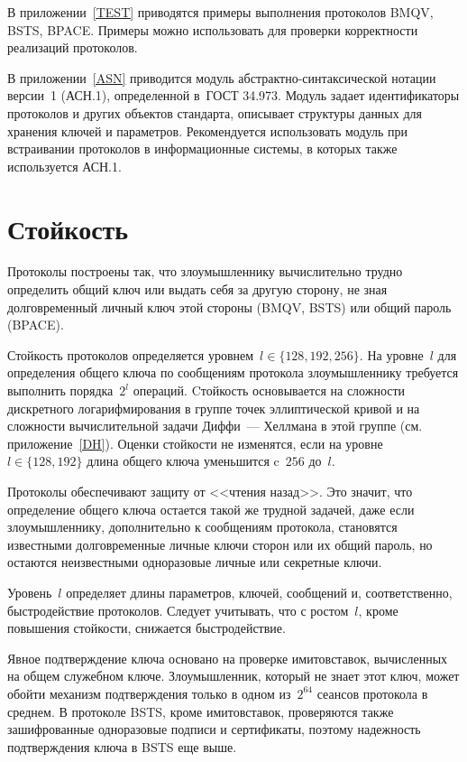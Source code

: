 В приложении~\ref{TEST} приводятся примеры выполнения 
протоколов BMQV, BSTS, BPACE.
Примеры можно использовать для проверки корректности реализаций 
протоколов.

В приложении~\ref{ASN} приводится модуль
абстрактно-синтаксической нотации версии~1 (АСН.1),
определенной в~ГОСТ 34.973.
Модуль задает идентификаторы протоколов и других объектов 
стандарта, описывает структуры данных для хранения 
ключей и параметров.
%
Рекомендуется использовать модуль 
при встраивании протоколов в информационные системы, 
в которых также используется АСН.1.

\section{Стойкость}\label{COMMON.Strength}

Протоколы построены так, что злоумышленнику 
вычислительно трудно определить общий ключ или 
выдать себя за другую сторону, не зная долговременный 
личный ключ этой стороны (BMQV, BSTS) или общий пароль (BPACE).

Стойкость протоколов определяется уровнем~$l\in\{128,192,256\}$.
%
На уровне~$l$ для определения общего ключа по сообщениям
протокола злоумышленнику требуется выполнить 
порядка~$2^l$ операций. 
%
Cтойкость основывается на сложности дискретного логарифмирования 
в группе точек эллиптической кривой
и на сложности вычислительной задачи 
Диффи~--- Хеллмана в этой группе (см. приложение~\ref{DH}).
%
Оценки стойкости не изменятся, 
если на уровне~$l\in\{128,192\}$ длина общего ключа уменьшится 
c~$256$ до~$l$.

Протоколы обеспечивают защиту от <<чтения назад>>. 
Это значит, что определение общего ключа остается такой же трудной
задачей, даже если злоумышленнику, дополнительно к сообщениям протокола,
становятся известными долговременные личные ключи сторон или
их общий пароль, но остаются неизвестными одноразовые 
личные или секретные ключи.
%


Уровень~$l$ определяет длины параметров, 
ключей, сообщений и, соответственно, быстродействие протоколов. 
%
Следует учитывать, что с ростом~$l$, кроме повышения стойкости,
снижается быстродействие.

Явное подтверждение ключа основано на проверке имитовставок,
вычисленных на общем служебном ключе. 
Злоумышленник, который не знает этот ключ, 
может обойти механизм подтверждения только в одном из~$2^{64}$ сеансов
протокола в среднем. 
%
В протоколе BSTS, кроме имитовставок, 
проверяются также зашифрованные одноразовые подписи и сертификаты, 
поэтому надежность подтверждения ключа в BSTS еще выше.

